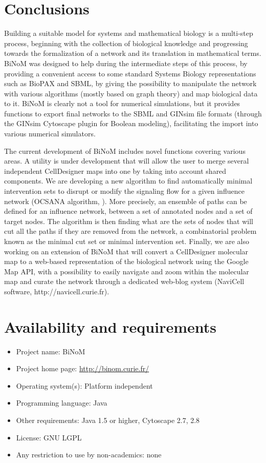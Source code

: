 \documentclass[10pt]{bmc_article}
\newenvironment{bmcformat}{\baselineskip20pt\sloppy\setboolean{publ}{false}}{\baselineskip20pt\sloppy}
\begin{document}
\begin{bmcformat}
\section*{Conclusions}

Building a suitable model for systems and mathematical biology is a multi-step
process, beginning with the collection of biological knowledge and progressing
towards the formalization of a network and its translation in mathematical
terms. BiNoM was designed to help during the intermediate steps of this process,
by providing a convenient access to some standard Systems Biology
representations such as BioPAX and SBML, by giving the possibility to manipulate the
network with various algorithms (mostly based on graph theory)
and map biological data to it. BiNoM is clearly not a tool for numerical
simulations, but it provides functions to export final networks to the SBML and
GINsim file formats (through the GINsim Cytoscape plugin for Boolean modeling), facilitating the
import into various numerical simulators.

The current development of BiNoM includes novel functions covering various
areas. A utility is under development that will allow the user to merge several
independent CellDesigner maps into one by taking into account shared components.
We are developing a new algorithm to find automatically minimal
intervention sets to disrupt or modify the
signaling flow for a given influence network (OCSANA algorithm,
\cite{Vera-Licona2012OCSANA}). More precisely, an ensemble of paths can be
defined for an influence network, between a set of annotated nodes and a set of
target nodes. The algorithm is then finding what are the sets of nodes that will
cut all the paths if they are removed from the network, a combinatorial problem
known as the minimal cut set or minimal intervention set. Finally, we are
also working on an extension of BiNoM that will convert a CellDesigner molecular
map to a web-based representation of the biological network
using the Google Map API, with a possibility to easily navigate and zoom within
the molecular map and curate the network through a dedicated web-blog system (NaviCell
software, http://navicell.curie.fr).

\section*{Availability and requirements}

\begin{itemize}
\item Project name: BiNoM
\item Project home page: \url{http://binom.curie.fr/}
\item Operating system(s): Platform independent
\item Programming language: Java
\item Other requirements: Java 1.5 or higher, Cytoscape 2.7, 2.8
\item License: GNU LGPL
\item Any restriction to use by non-academics: none
\end{itemize}





\end{bmcformat}
\end{document}
